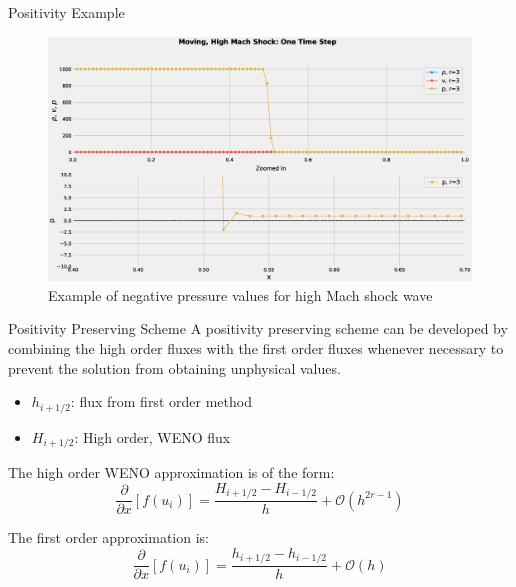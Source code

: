 \documentclass[9pt]{beamer}
\begin{document}
\begin{frame}{Positivity Example}
  \begin{figure}[H]
    \centering
    \includegraphics[scale=0.25]{PositivityZoom_wide.eps}\caption{Example of negative pressure values for high Mach shock wave}
    \end{figure}
\end{frame}




\begin{frame}{Positivity Preserving Scheme}
  A positivity preserving scheme can be developed by combining the high order fluxes with the first order fluxes whenever necessary to prevent the solution from obtaining unphysical values.
  \begin{itemize}
    \item $h_{i+1/2}$: flux from first order method
    \item $H_{i+1/2}$: High order, WENO flux
  \end{itemize}
  
  The high order WENO approximation is of the form:
  $$
  \frac{\partial}{\partial x}[f(u_i)] = \frac{H_{i+1 /2} - H_{i-1/2}}{h}+\mathcal{O}(h^{2r-1})
  $$

  The first order approximation is:
  $$
  \frac{\partial}{\partial x}[f(u_i)] = \frac{h_{i+1 /2} - h_{i-1/2}}{h}+\mathcal{O}(h)
  $$
\end{frame}
\end{document}
